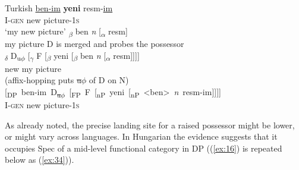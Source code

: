 \documentclass[output=paper
,modfonts
,nonflat]{langsci/langscibook}
\begin{document}
\begin{exe} \settowidth{}
	\ex Turkish \label{ex:33}
	\xlist
	\ex 
	\gll\underline{ben}\underline{-im}   \textbf{yeni}  resm-\underline{im} \\
	I-\textsc{gen}  new   picture-1\textsc{s}\\
	\glt `my new picture'  	
	\ex {\lbrack}\textsubscript{$\beta$} ben \textit{n} [\textsubscript{$\alpha$} resm]{\rbrack}\\
	\hspace{0.5cm}my	\hspace{0.8cm}picture
	\ex D is merged and probes the possessor\\
	{\lbrack}\textsubscript{$\delta$} D\textsubscript{u}\textsubscript{$\phi$} [\textsubscript{$\gamma$} F [\textsubscript{$\beta$} yeni [\textsubscript{${\beta}$} ben \textit{n} [\textsubscript{$\alpha$} resm]]]]{\rbrack}\\
	\hspace{2.3cm}new  \hspace{.4cm}my \hspace{.8cm}picture\\
	\ex\label{ex:33d} (affix-hopping puts \sout{u$\phi$} of D on N)\\
	\mbox{[\textsubscript{DP} ben-im D\textsubscript{\sout{u$\phi$}} [\textsubscript{FP} F [\textsubscript{nP} yeni [\textsubscript{nP} <ben> \textit{n} resm-im]]]]}\\ 
	\hspace{.59cm}I-\textsc{gen} \hspace{2.38cm}new  \hspace{1.95cm}picture-1\textsc{s}\\
	\endxlist
\end{exe}
As already noted, the precise landing site for a raised possessor might be lower, or might vary across languages. In Hungarian the evidence suggests that it occupies Spec of a mid-level functional category in DP ((\ref{ex:16}) is repeated below as (\ref{ex:34})). 
\end{document}
